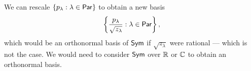 \begin{remark}
	We can rescale \(\{p_\lambda : \lambda \in \operatorname{\mathsf{Par}}\}\) to obtain a new basis
	\begin{equation}
		\left\{ \frac{p_\lambda}{\sqrt{z_\lambda}} : \lambda \in \operatorname{\mathsf{Par}} \right\},
	\end{equation}
	which would be an orthonormal basis of \(\operatorname{\mathsf{Sym}}\) if \(\sqrt{z_\lambda}\) were rational --- which is not the case.
	We would need to consider \(\operatorname{\mathsf{Sym}}\) over \(\mathbb{R}\) or \(\mathbb{C}\) to obtain an orthonormal basis.
\end{remark}